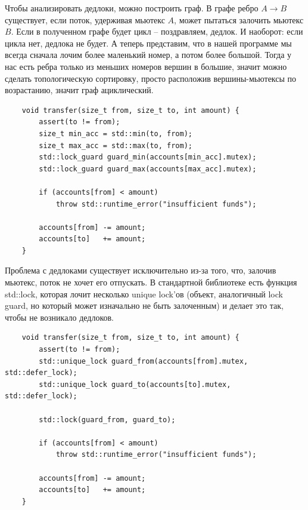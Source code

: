 \documentclass[12pt, a4paper]{article}
\begin{document}
\par Чтобы анализировать дедлоки, можно построить граф. В графе ребро $A\rightarrow B$ существует, если поток, удерживая мьютекс $A$, может пытаться залочить мьютекс $B$. Если в полученном графе будет цикл -- поздравляем, дедлок. И наоборот: если цикла нет, дедлока не будет. А теперь представим, что в нашей программе мы всегда сначала лочим более маленький номер, а потом более большой. Тогда у нас есть ребра только из меньших номеров вершин в большие, значит можно сделать топологическую сортировку, просто расположив вершины-мьютексы по возрастанию, значит граф ациклический. 
\begin{verbatim}
	void transfer(size_t from, size_t to, int amount) {
		assert(to != from);
		size_t min_acc = std::min(to, from);
		size_t max_acc = std::max(to, from);
		std::lock_guard guard_min(accounts[min_acc].mutex);
		std::lock_guard guard_max(accounts[max_acc].mutex);
		
		if (accounts[from] < amount)
			throw std::runtime_error("insufficient funds");
		
		accounts[from] -= amount;
		accounts[to]   += amount;
	}
\end{verbatim}
Проблема с дедлоками существует исключительно из-за того, что, залочив мьютекс, поток не хочет его отпускать. В стандартной библиотеке есть функция std::lock, которая лочит несколько unique lock'ов (объект, аналогичный lock guard, но который может изначально не быть залоченным) и делает это так, чтобы не возникало дедлоков. 
\begin{verbatim}
	void transfer(size_t from, size_t to, int amount) {
		assert(to != from);
		std::unique_lock guard_from(accounts[from].mutex, std::defer_lock);
		std::unique_lock guard_to(accounts[to].mutex, std::defer_lock);
		
		std::lock(guard_from, guard_to);
		
		if (accounts[from] < amount)
			throw std::runtime_error("insufficient funds");
		
		accounts[from] -= amount;
		accounts[to]   += amount;
	}
\end{verbatim}
\end{document}
